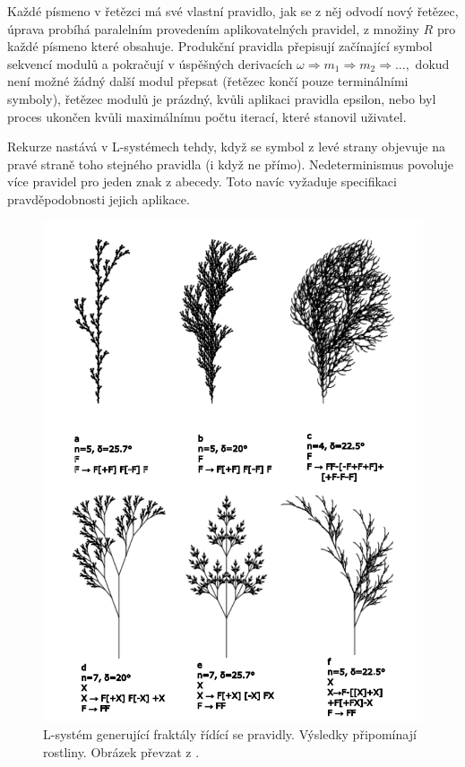 Každé písmeno v řetězci má své vlastní pravidlo, jak se z něj odvodí nový řetězec, úprava probíhá paralelním provedením aplikovatelných pravidel, z množiny $R$ pro každé písmeno které obsahuje. Produkční pravidla přepisují začínající symbol sekvencí modulů a pokračují v úspěšných derivacích $\omega \Rightarrow m_1 \Rightarrow m_2 \Rightarrow \ldots,$ dokud není možné žádný další modul přepsat (řetězec končí pouze terminálními symboly), řetězec modulů je prázdný, kvůli aplikaci pravidla epsilon, nebo byl proces ukončen kvůli maximálnímu počtu iterací, které stanovil uživatel.~\cite{lindenmayer1968mathematical}

Rekurze nastává v L-systémech tehdy, když se symbol z levé strany objevuje na pravé straně toho stejného pravidla (i když ne přímo). Nedeterminismus povoluje více pravidel pro jeden znak z abecedy. Toto navíc vyžaduje specifikaci pravděpodobnosti jejich aplikace.~\cite{lindenmayer1968mathematical}

\begin{figure}[H]
	\centering
	\includegraphics[scale=0.9]{obrazky-figures/LTrees.pdf}
	\caption{L-systém generující fraktály řídící se pravidly. Výsledky připomínají rostliny. Obrázek převzat z \cite{prusinkiewicz2012algorithmic}.}
	\label{lSystem}
\end{figure}

